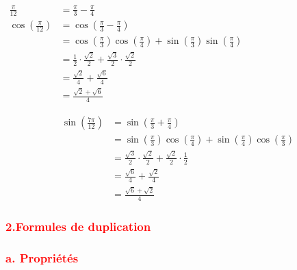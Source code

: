 \documentclass[a4paper,12pt]{article}
\begin{document}
\(
\begin{aligned}
    \frac{\pi}{12}                  & = \frac{\pi}{3} - \frac{\pi}{4}                                                                                               \\
    \cos\left(\frac{\pi}{12}\right) & = \cos\left(\frac{\pi}{3} - \frac{\pi}{4}\right)                                                                              \\
                                    & = \cos\left(\frac{\pi}{3}\right)\cos\left(\frac{\pi}{4}\right) + \sin\left(\frac{\pi}{3}\right)\sin\left(\frac{\pi}{4}\right) \\
                                    & = \frac{1}{2} \cdot \frac{\sqrt{2}}{2} + \frac{\sqrt{3}}{2} \cdot \frac{\sqrt{2}}{2}                                          \\
                                    & = \frac{\sqrt{2}}{4} + \frac{\sqrt{6}}{4}                                                                                     \\
                                    & = \boxed{\frac{\sqrt{2} + \sqrt{6}}{4}}
\end{aligned}
\)

\[
    \begin{aligned}
        \sin\left(\frac{7\pi}{12}\right)
         & = \sin\left(\frac{\pi}{3} + \frac{\pi}{4} \right)                                                                               \\
         & = \sin\left(\frac{\pi}{3}\right) \cos\left(\frac{\pi}{4}\right) + \sin\left(\frac{\pi}{4}\right) \cos\left(\frac{\pi}{3}\right) \\
         & = \frac{\sqrt{3}}{2} \cdot \frac{\sqrt{2}}{2} + \frac{\sqrt{2}}{2} \cdot \frac{1}{2}                                            \\
         & = \frac{\sqrt{6}}{4} + \frac{\sqrt{2}}{4}                                                                                       \\
         & = \boxed{\frac{\sqrt{6} + \sqrt{2}}{4}}
    \end{aligned}
\]

\subsubsection*{\textcolor{red}{2.Formules de duplication }}
\subsubsection*{\textcolor{red}{a. Propriétés }}
\end{document}
